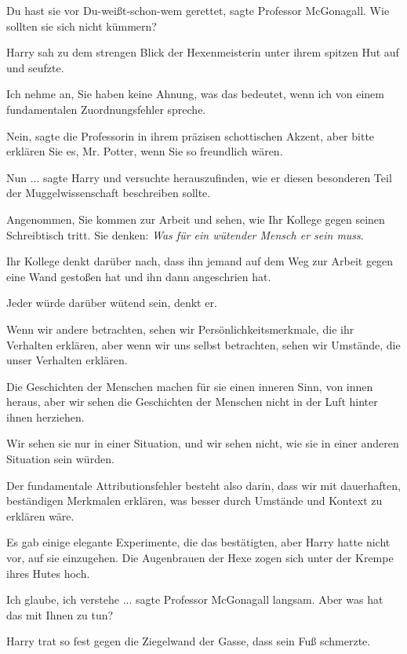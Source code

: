 \glqq{}Du hast sie vor Du-weißt-schon-wem gerettet\grqq{}, sagte Professor
McGonagall. \glqq{}Wie sollten sie sich nicht kümmern?\grqq{}

Harry sah zu dem strengen Blick der Hexenmeisterin unter ihrem spitzen Hut auf
und seufzte.

\glqq{}Ich nehme an, Sie haben keine Ahnung, was das bedeutet, wenn ich von einem
fundamentalen Zuordnungsfehler spreche.\grqq{}

\glqq{}Nein\grqq{}, sagte die Professorin in ihrem präzisen schottischen Akzent,
\glqq{}aber bitte erklären Sie es, Mr. Potter, wenn Sie so freundlich
wären.\grqq{}

\glqq{}Nun ...\grqq{} sagte Harry und versuchte herauszufinden, wie er diesen
besonderen Teil der Muggelwissenschaft beschreiben sollte.

\glqq{}Angenommen, Sie kommen zur Arbeit und sehen, wie Ihr Kollege gegen seinen
Schreibtisch tritt. Sie denken: \glqq{}\emph{Was für ein wütender Mensch er sein
muss}\grqq{}.

\glqq{}Ihr Kollege denkt darüber nach, dass ihn jemand auf dem Weg zur Arbeit
gegen eine Wand gestoßen hat und ihn dann angeschrien hat.\grqq{}

\glqq{}Jeder würde darüber wütend sein, denkt er.\grqq{}

\glqq{}Wenn wir andere betrachten, sehen wir Persönlichkeitsmerkmale, die ihr
Verhalten erklären, aber wenn wir uns selbst betrachten, sehen wir Umstände, die
unser Verhalten erklären.\grqq{}

\glqq{}Die Geschichten der Menschen machen für sie einen inneren Sinn, von innen
heraus, aber wir sehen die Geschichten der Menschen nicht in der Luft hinter
ihnen herziehen.\grqq{}

\glqq{}Wir sehen sie nur in einer Situation, und wir sehen nicht, wie sie in
einer anderen Situation sein würden.\grqq{}

\glqq{}Der fundamentale Attributionsfehler besteht also darin, dass wir mit
dauerhaften, beständigen Merkmalen erklären, was besser durch Umstände und
Kontext zu erklären wäre.\grqq{}

Es gab einige elegante Experimente, die das bestätigten, aber Harry hatte nicht
vor, auf sie einzugehen. Die Augenbrauen der Hexe zogen sich unter der Krempe
ihres Hutes hoch.

\glqq{}Ich glaube, ich verstehe ...\grqq{} sagte Professor McGonagall langsam.
\glqq{}Aber was hat das mit Ihnen zu tun?\grqq{}

Harry trat so fest gegen die Ziegelwand der Gasse, dass sein Fuß schmerzte.

